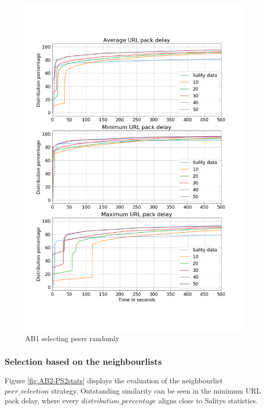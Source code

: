 \documentclass{article}
\begin{document}
\begin{figure}[H]
    \centering
    \includegraphics[width=\textwidth]{BV2-PS1.png}
    \caption{AB1 selecting peers randomly}
    \label{fig:AB1-PS1stats}
\end{figure}

\subsubsection*{Selection based on the neighbourlists}
Figure \ref{fig:AB2-PS2stats} displays the evaluation of the neighbourlist $peer\_selection$ strategy. Outstanding similarity can be seen in the minimum URL pack delay, where every $distribution\_percentage$ aligns close to Salitys statistics. 
\end{document}
